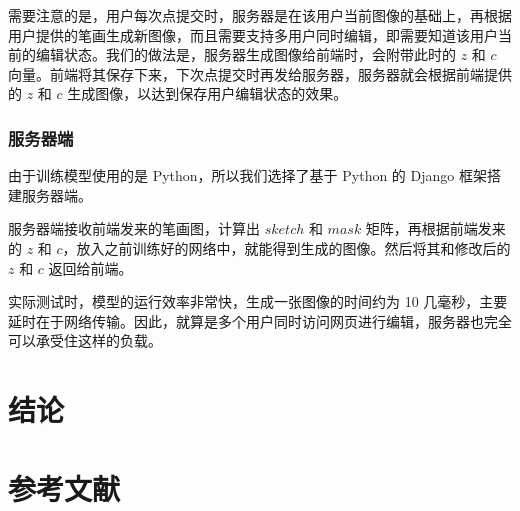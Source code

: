 \documentclass[a4paper,12pt,UTF8]{ctexart}
\begin{document}
需要注意的是，用户每次点提交时，服务器是在该用户当前图像的基础上，再根据用户提供的笔画生成新图像，而且需要支持多用户同时编辑，即需要知道该用户当前的编辑状态。我们的做法是，服务器生成图像给前端时，会附带此时的 $z$ 和 $c$ 向量。前端将其保存下来，下次点提交时再发给服务器，服务器就会根据前端提供的 $z$ 和 $c$ 生成图像，以达到保存用户编辑状态的效果。

\subsubsection{服务器端}
由于训练模型使用的是 Python，所以我们选择了基于 Python 的 Django 框架搭建服务器端。

服务器端接收前端发来的笔画图，计算出 $sketch$ 和 $mask$ 矩阵，再根据前端发来的 $z$ 和 $c$，放入之前训练好的网络中，就能得到生成的图像。然后将其和修改后的 $z$ 和 $c$ 返回给前端。

实际测试时，模型的运行效率非常快，生成一张图像的时间约为 10 几毫秒，主要延时在于网络传输。因此，就算是多个用户同时访问网页进行编辑，服务器也完全可以承受住这样的负载。

\section{结论}



\section*{参考文献}

\medskip

{\small


}
\end{document}
